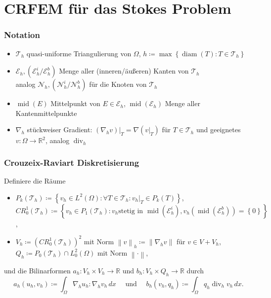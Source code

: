 \documentclass[a4paper, 10pt]{article}
\newcommand{\real}{\mathbb{R}}
\newcommand{\norm}[1][\cdot]{\left\lVert#1\right\rVert}
\newcommand{\set}[1]{\left\{#1\right\}}
\newcommand{\dx}{\,dx}
\newcommand{\mesh}{\mathcal{T}_h}
\newcommand{\edges}{\mathcal{E}_h}
\newcommand{\nodes}{\mathcal{N}_h}
\newcommand{\crs}{CR_0^1}
\DeclareMathOperator{\divop}{div}
\DeclareMathOperator{\diamop}{diam}
\DeclareMathOperator{\midop}{mid}
\theoremstyle{definition}
\theoremstyle{plain}
\begin{document}
\section{CRFEM für das Stokes Problem}
\label{sec:crfem-fur-das}

\subsubsection*{Notation}
\label{sec:notation-1}

\begin{itemize}
\item \(\mesh\) quasi-uniforme Triangulierung von \(\Omega\), \(h \coloneqq \max\set{\diamop(T)\colon T \in \mesh}\)
\item \(\edges, (\edges^i/\edges^b)\) Menge aller (inneren/äußeren)
  Kanten von \(\mesh\)\\
  analog \(\nodes, (\nodes^i/\nodes^b)\) für die Knoten von \(\mesh\)
\item \(\midop(E)\) Mittelpunkt von \(E \in \edges\),
  \(\midop(\edges)\) Menge aller Kantenmittelpunkte
\item \(\nabla_h\) stückweiser Gradient: \((\nabla_h v)\vert_T = \nabla
  (v\vert_T)\) für \(T\in \mesh\) und geeignetes \(v\colon \Omega \to
  \real^2\), analog \(\divop_h\)
\end{itemize}

\subsubsection*{Crouzeix-Raviart Diskretisierung}
\label{sec:crouz-ravi-diskr}

\noindent Definiere die Räume
\begin{itemize}
\item \(P_k(\mesh) \coloneqq \set{v_h \in L^2(\Omega)\colon \forall T
    \in \mesh\colon v_h\vert_T \in P_k(T)}\),\\
  \(\crs(\mesh) \coloneqq \set{v_h \in P_1(\mesh)\colon v_h \text{
      stetig in } \midop(\edges^i), v_h(\midop(\edges^b)) = \set{0}}\),
\item \(V_h \coloneqq \left(\crs(\mesh)\right)^2\) mit Norm
  \(\norm[v]_h \coloneqq \norm[\nabla_h v]\) für \(v \in V + V_h\),\\
  \(Q_h \coloneqq P_0(\mesh) \cap L^2_0(\Omega)\) mit Norm
  \(\norm\), 
\end{itemize}

\noindent und die Bilinarformen \(a_h\colon V_h \times V_h \to \real\)
und \(b_h \colon V_h \times Q_h \to \real\) durch 
\[
    a_h(u_h, v_h) \coloneqq \int_\Omega \nabla_h u_h : \nabla_h v_h \dx
    \quad \text{ und } \quad b_h(v_h, q_h) \coloneqq \int_\Omega q_h\divop_h v_h \dx. 
\]
\end{document}
